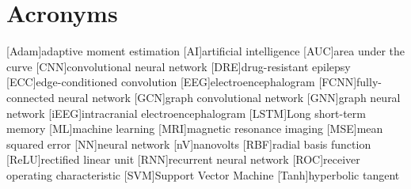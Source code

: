 
\chapter{Acronyms} \label{chap: Acronyms}

\begin{acronym}[AAAAA]
    [Adam]{adaptive moment estimation}
    [AI]{artificial intelligence}
    [AUC]{area under the curve}
    [CNN]{convolutional neural network}
    [DRE]{drug-resistant epilepsy}
    [ECC]{edge-conditioned convolution}
    [EEG]{electroencephalogram}
    [FCNN]{fully-connected neural network}
    [GCN]{graph convolutional network}
    [GNN]{graph neural network}
    [iEEG]{intracranial electroencephalogram}
    [LSTM]{Long short-term memory}
    [ML]{machine learning}
    [MRI]{magnetic resonance imaging}
    [MSE]{mean squared error}
    [NN]{neural network}
    [nV]{nanovolts}
    [RBF]{radial basis function}
    [ReLU]{rectified linear unit}
    [RNN]{recurrent neural network}
    [ROC]{receiver operating characteristic}
    [SVM]{Support Vector Machine}
    [Tanh]{hyperbolic tangent}
\end{acronym}
